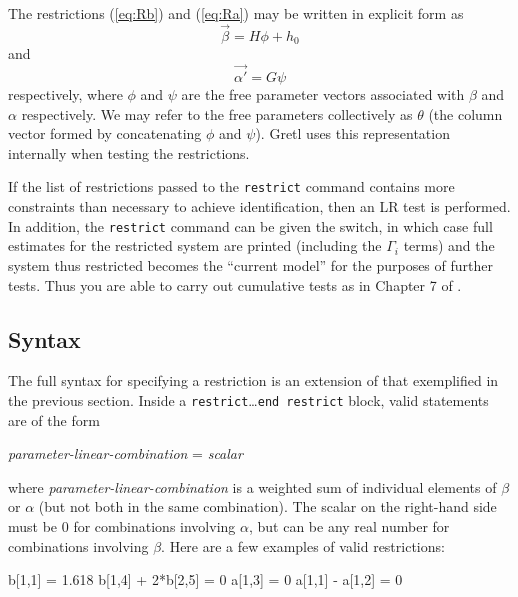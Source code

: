 The restrictions (\ref{eq:Rb}) and (\ref{eq:Ra}) may be written in
explicit form as
\begin{equation}
\label{eq:vecbeta}
\vec{\beta} = H\phi + h_0
\end{equation}
and
\begin{equation}
\label{eq:vecalpha}
\vec{\alpha'} = G\psi
\end{equation}
respectively, where $\phi$ and $\psi$ are the free parameter vectors
associated with $\beta$ and $\alpha$ respectively.  We may refer
to the free parameters collectively as $\theta$ (the column vector
formed by concatenating $\phi$ and $\psi$).  Gretl uses this
representation internally when testing the restrictions.

If the list of restrictions passed to the \texttt{restrict} command
contains more constraints than necessary to achieve identification,
then an LR test is performed. In addition, the \texttt{restrict}
command can be given the  switch, in which case full
estimates for the restricted system are printed (including the
$\Gamma_i$ terms) and the system thus restricted becomes the ``current
model'' for the purposes of further tests.  Thus you are able to carry
out cumulative tests as in Chapter 7 of \cite{johansen95}.

\subsection{Syntax}
\label{sec:vecm-restr-syntax}

The full syntax for specifying a restriction is an extension of
that exemplified in the previous section. Inside a
\texttt{restrict}\ldots\texttt{end restrict} block, valid statements
are of the form
\begin{center}
  \textsl{parameter-linear-combination} = \textsl{scalar}
\end{center}
where \textsl{parameter-linear-combination} is a weighted sum of
individual elements of $\beta$ or $\alpha$ (but not both in the same
combination). The scalar on the right-hand side must be 0 for
combinations involving $\alpha$, but can be any real number for
combinations involving $\beta$. Here are a few examples of valid
restrictions:
\begin{code}
  b[1,1] = 1.618
  b[1,4] + 2*b[2,5] = 0
  a[1,3] = 0
  a[1,1] - a[1,2] = 0
\end{code}


